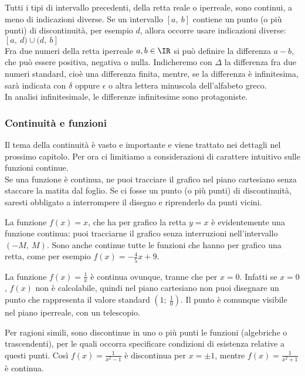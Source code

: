 Tutti i tipi di intervallo precedenti, della retta reale o iperreale, sono
continui, a meno di indicazioni diverse. Se un intervallo $[a,\ b]$ contiene un punto
(o più punti) di discontinuità, per esempio $d$, allora occorre usare indicazioni
diverse: $[a,\ d)\cup(d,\ b]$\\ 
Fra due numeri della retta iperreale $a, b \in \IR$ si può definire la differenza
$a-b$, che può essere positiva, negativa o nulla. Indicheremo con $\Delta$ la 
differenza fra due numeri standard, cioè una differenza finita, mentre, se la 
differenza è infinitesima, sarà indicata con $\delta$ oppure $\epsilon$
o altra lettera minuscola dell'alfabeto greco.\\
In analisi infinitesimale, le differenze infinitesime sono protagoniste.

\subsubsection{Continuità e funzioni}
\label{04_diffcontfunzioni}
Il tema della continuità è vasto e importante e viene trattato nei dettagli
nel prossimo capitolo. Per ora ci limitiamo a considerazioni di carattere intuitivo 
sulle funzioni continue.\\
Se una funzione è continua, ne puoi tracciare il grafico nel piano cartesiano 
senza staccare la matita dal foglio. Se ci fosse un punto (o più punti)
di discontinuità, saresti obbligato a interrompere il disegno e riprenderlo
da punti vicini.
\begin{esempio}
 La funzione $f(x)=x$, che ha per grafico la retta $y=x$ è evidentemente 
 una funzione continua: puoi tracciarne il grafico senza interruzioni
 nell'intervallo $(-M,\ M)$. Sono anche continue tutte le funzioni che hanno
 per grafico una retta, come per esempio $f(x)=-\frac{4}{5}x+9$.
\end{esempio}
\begin{esempio}
 La funzione $f(x)=\frac{1}{x}$ è continua ovunque, tranne che per $x=0$.
 Infatti se $x=0$, $f(x)$ non è calcolabile, quindi nel piano cartesiano 
 non puoi disegnare un punto  che rappresenta il valore standard 
 $(1;\ \frac{1}{0})$. Il punto è comunque visibile nel piano iperreale, con un
 telescopio.\\
 \end{esempio}
\begin{esempio}
 Per ragioni simili, sono discontinue in uno o più punti le funzioni
 (algebriche o trascendenti), per le quali occorra specificare condizioni 
 di esistenza relative a questi punti.
 Così $f(x)=\frac{1}{x^2-1}$ è discontinua per $x=\pm 1$, mentre 
 $f(x)=\frac{1}{x^2+1}$ è continua.
\end{esempio}

